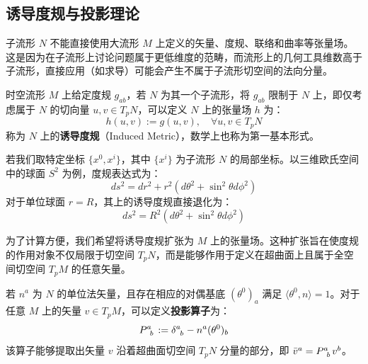 \subsection{诱导度规与投影理论}

子流形 $N$ 不能直接使用大流形 $M$ 上定义的矢量、度规、联络和曲率等张量场。这是因为在子流形上讨论问题属于更低维度的范畴，而流形上的几何工具维数高于子流形，直接应用（如求导）可能会产生不属于子流形切空间的法向分量。

\begin{definition}[诱导度规]
    时空流形 $M$ 上给定度规 $g_{ab}$，若 $N$ 为其一个子流形，将 $g_{ab}$ 限制于 $N$ 上，即仅考虑属于 $N$ 的切向量 $u, v \in T_p N$，可以定义 $N$ 上的张量场 $h$ 为：
    \begin{equation}
        h(u, v) := g(u, v), \quad \forall u, v \in T_p N
    \end{equation}
    称为 $N$ 上的\textbf{诱导度规}（Induced Metric），数学上也称为第一基本形式。
\end{definition}

\begin{example}[特定坐标下的诱导度规]
    若我们取特定坐标 $\{x^0, x^i\}$，其中 $\{x^i\}$ 为子流形 $N$ 的局部坐标。以三维欧氏空间中的球面 $S^2$ 为例，度规表达式为：
    \begin{equation}
        ds^2 = dr^2 + r^2(d\theta^2 + \sin^2 \theta d\phi^2)
    \end{equation}
    对于单位球面 $r=R$，其上的诱导度规直接退化为：
    \begin{equation}
        ds^2 = R^2(d\theta^2 + \sin^2 \theta d\phi^2)
    \end{equation}
\end{example}

为了计算方便，我们希望将诱导度规扩张为 $M$ 上的张量场。这种扩张旨在使度规的作用对象不仅局限于切空间 $T_p N$，而是能够作用于定义在超曲面上且属于全空间切空间 $T_p M$ 的任意矢量。

\begin{definition}[投影算子]
    若 $n^a$ 为 $N$ 的单位法矢量，且存在相应的对偶基底 $(\theta^0)_a$ 满足 $\langle \theta^0, n \rangle = 1$。对于任意 $M$ 上的矢量 $v \in T_p M$，可以定义\textbf{投影算子}为：
    \begin{equation}
        \tensor{P}{^a_b} := \tensor{\delta}{^a_b} - n^a (\theta^0)_b
    \end{equation}
    该算子能够提取出矢量 $v$ 沿着超曲面切空间 $T_p N$ 分量的部分，即 $\bar{v}^a = \tensor{P}{^a_b} v^b$。
\end{definition}

